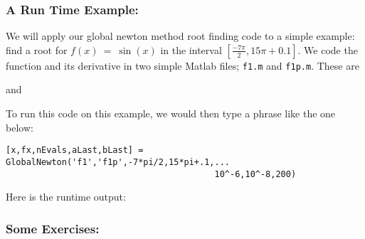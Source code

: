 \documentclass[11pt]{SelfArxOneColBMN}
\begin{document}
\singlespacing

\onehalfspacing

\subsubsection{A Run Time Example:}

We will apply our global newton method root finding code to
a simple example: find a root for $f(x) \: = \: \sin(x)$ in the
interval $[\frac{-7 \pi}{2}, 15 \pi + 0.1]$.  We code the
function and its derivative in two simple Matlab files;
{\tt f1.m} and {\tt f1p.m}.  These are

\singlespacing

\onehalfspacing

\noindent
and

\singlespacing

\onehalfspacing

\noindent
To run this code on this example, we would then type
a phrase like the one below:

\singlespacing
{}
\begin{lstlisting}
[x,fx,nEvals,aLast,bLast] = GlobalNewton('f1','f1p',-7*pi/2,15*pi+.1,...
                                         10^-6,10^-8,200)
\end{lstlisting}
\lstset{fancyvrb=false}
\onehalfspacing	

\noindent
Here is the runtime output:				 

\singlespacing

\onehalfspacing

\subsubsection{Some Exercises:}
\end{document}
